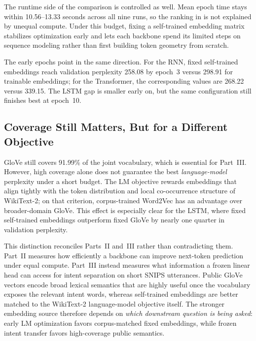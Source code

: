 \documentclass[10pt,a4paper]{article}
\begin{document}
The runtime side of the comparison is controlled as well. Mean epoch time stays within 10.56--13.33 seconds across all nine runs, so the ranking in  is not explained by unequal compute. Under this budget, fixing a self-trained embedding matrix stabilizes optimization early and lets each backbone spend its limited steps on sequence modeling rather than first building token geometry from scratch.

The early epochs point in the same direction. For the RNN, fixed self-trained embeddings reach validation perplexity 258.08 by epoch~3 versus 298.91 for trainable embeddings; for the Transformer, the corresponding values are 268.22 versus 339.15. The LSTM gap is smaller early on, but the same configuration still finishes best at epoch~10.

\subsection{Coverage Still Matters, But for a Different Objective}

GloVe still covers 91.99\% of the joint vocabulary, which is essential for Part~III. However, high coverage alone does not guarantee the best \emph{language-model} perplexity under a short budget. The LM objective rewards embeddings that align tightly with the token distribution and local co-occurrence structure of WikiText-2; on that criterion, corpus-trained Word2Vec has an advantage over broader-domain GloVe. This effect is especially clear for the LSTM, where fixed self-trained embeddings outperform fixed GloVe by nearly one quarter in validation perplexity.

This distinction reconciles Parts~II and~III rather than contradicting them. Part~II measures how efficiently a backbone can improve next-token prediction under equal compute. Part~III instead measures what information a frozen linear head can access for intent separation on short SNIPS utterances. Public GloVe vectors encode broad lexical semantics that are highly useful once the vocabulary exposes the relevant intent words, whereas self-trained embeddings are better matched to the WikiText-2 language-model objective itself. The stronger embedding source therefore depends on \emph{which downstream question is being asked}: early LM optimization favors corpus-matched fixed embeddings, while frozen intent transfer favors high-coverage public semantics.

\FloatBarrier


\end{document}
